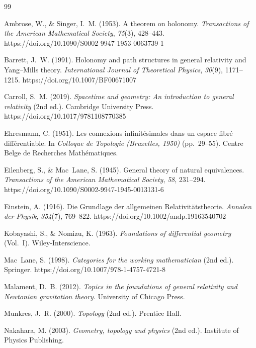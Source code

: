 \documentclass[12pt]{article}
\begin{document}
\begin{sloppypar}
\raggedright
\begin{thebibliography}{99}

Ambrose, W., \& Singer, I.~M. (1953).
A theorem on holonomy.
\textit{Transactions of the American Mathematical Society}, \textit{75}(3),
428--443. https://doi.org/10.1090/S0002-9947-1953-0063739-1

Barrett, J.~W. (1991).
Holonomy and path structures in general relativity and Yang--Mills theory.
\textit{International Journal of Theoretical Physics}, \textit{30}(9),
1171--1215. https://doi.org/10.1007/BF00671007

Carroll, S.~M. (2019).
\textit{Spacetime and geometry: An introduction to general relativity}
(2nd ed.). Cambridge University Press. https://doi.org/10.1017/9781108770385

Ehresmann, C. (1951).
Les connexions infinit\'esimales dans un espace fibr\'e diff\'erentiable.
In \textit{Colloque de Topologie (Bruxelles, 1950)} (pp.~29--55).
Centre Belge de Recherches Math\'ematiques.

Eilenberg, S., \& Mac~Lane, S. (1945).
General theory of natural equivalences.
\textit{Transactions of the American Mathematical Society}, \textit{58},
231--294. https://doi.org/10.1090/S0002-9947-1945-0013131-6

Einstein, A. (1916).
Die Grundlage der allgemeinen Relativit\"atstheorie.
\textit{Annalen der Physik}, \textit{354}(7), 769--822.
https://doi.org/10.1002/andp.19163540702

Kobayashi, S., \& Nomizu, K. (1963).
\textit{Foundations of differential geometry} (Vol.~I).
Wiley-Interscience.

Mac~Lane, S. (1998).
\textit{Categories for the working mathematician} (2nd ed.).
Springer. https://doi.org/10.1007/978-1-4757-4721-8

Malament, D.~B. (2012).
\textit{Topics in the foundations of general relativity and Newtonian
gravitation theory}. University of Chicago Press.

Munkres, J.~R. (2000).
\textit{Topology} (2nd ed.). Prentice Hall.

Nakahara, M. (2003).
\textit{Geometry, topology and physics} (2nd ed.).
Institute of Physics Publishing.


\end{thebibliography}
\end{sloppypar}
\end{document}
